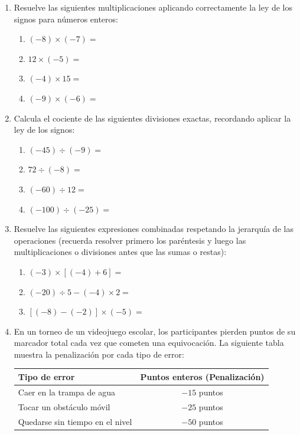 \documentclass[12pt, letterpaper]{article}
\begin{document}
	\begin{enumerate}[itemsep=0.8cm]
		
		\item Resuelve las siguientes multiplicaciones aplicando correctamente la ley de los signos para números enteros:
		\begin{enumerate}[label=\alph*., itemsep=0.3cm, topsep=0.2cm]
			\item $(-8) \times (-7) =$
			\item $12 \times (-5) =$
			\item $(-4) \times 15 =$
			\item $(-9) \times (-6) =$
		\end{enumerate}
		
		\item Calcula el cociente de las siguientes divisiones exactas, recordando aplicar la ley de los signos:
		\begin{enumerate}[label=\alph*., itemsep=0.3cm, topsep=0.2cm]
			\item $(-45) \div (-9) =$
			\item $72 \div (-8) =$
			\item $(-60) \div 12 =$
			\item $(-100) \div (-25) =$
		\end{enumerate}
		
		\item Resuelve las siguientes expresiones combinadas respetando la jerarquía de las operaciones (recuerda resolver primero los paréntesis y luego las multiplicaciones o divisiones antes que las sumas o restas):
		\begin{enumerate}[label=\alph*., itemsep=0.3cm, topsep=0.2cm]
			\item $(-3) \times [ (-4) + 6 ] =$
			\item $(-20) \div 5 - (-4) \times 2 =$
			\item $[ (-8) - (-2) ] \times (-5) =$
		\end{enumerate}
		
		\item En un torneo de un videojuego escolar, los participantes pierden puntos de su marcador total cada vez que cometen una equivocación. La siguiente tabla muestra la penalización por cada tipo de error:
		
		\begin{table}[h]
			\centering
			\begin{tabular}{lc}
				\toprule
				\textbf{Tipo de error} & \textbf{Puntos enteros (Penalización)} \\
				\midrule
				Caer en la trampa de agua & $-15$ puntos \\
				Tocar un obstáculo móvil & $-25$ puntos \\
				Quedarse sin tiempo en el nivel & $-50$ puntos \\
				\bottomrule
			\end{tabular}
		\end{table}
		

\end{enumerate}
\end{document}
